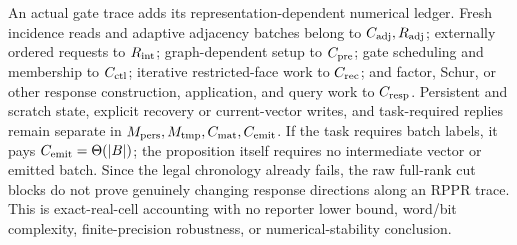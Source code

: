 \begin{remark}
An actual gate trace adds its representation-dependent numerical ledger.
Fresh incidence reads and adaptive adjacency batches belong to
$C_{\rm adj},R_{\rm adj}$; externally ordered requests to $R_{\rm int}$;
graph-dependent setup to $C_{\rm pre}$; gate scheduling and membership to
$C_{\rm ctl}$; iterative restricted-face work to $C_{\rm rec}$; and factor,
Schur, or other response construction, application, and query work to
$C_{\rm resp}$.  Persistent and scratch state, explicit recovery or
current-vector writes, and task-required replies remain separate in
$M_{\rm pers},M_{\rm tmp},C_{\rm mat},C_{\rm emit}$.  If the task requires
batch labels, it pays $C_{\rm emit}=\Theta(|B|)$; the proposition itself
requires no intermediate vector or emitted batch.  Since the legal chronology
already fails, the raw full-rank cut blocks do not prove genuinely changing
response directions along an RPPR trace.  This is exact-real-cell accounting
with no reporter lower bound, word/bit complexity, finite-precision
robustness, or numerical-stability conclusion.
\end{remark}

